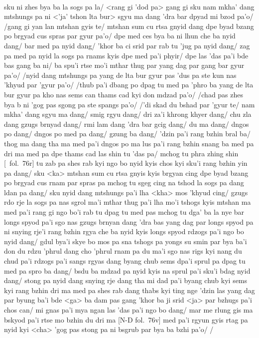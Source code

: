 \documentclass[12pt]{article}
\begin{document}
\textbf{\TVB}\\
sku ni zhes bya ba la sogs pa la/ <rang gi 'dod pa> gang gi sku nam mkha' dang mtshungs pa ni <'ja' tshon lta bur> sgyu ma dang 'dra bar dpyad mi bzod pa'o/ /gang gi yan lan mtshan gyis te/ mtshan sum cu rtsa gnyid dang dpe byad bzang po brgyad cus spras par gyur pa'o/ dpe med ces bya ba ni lhun che ba nyid dang/ bar med pa nyid dang/ 'khor ba ci srid par rab tu 'jug pa nyid dang/ zag pa med pa nyid la sogs pa rnams kyis dpe med pa'i phyir/ dpe las 'das pa'i bde bas gang ba ni/ ba spu'i rtse mo'i mthar thug par yang dag par gang bar gyur pa'o/ /nyid dang mtshungs pa yang de lta bur gyur pas 'dus pa ste kun nas 'khyud par 'gyur pa'o/ /thub pa'i dbang po dpag tu med pa 'phro ba yang de lta bur gyur pa kho nas sems can thams cad kyi don mdzad pa'o/ /chad pas zhes bya b ni 'gog pas sgong pa ste spangs pa'o/ /'di skad du bshad par 'gyur te/ nam mkha' dang sgyu ma dang/ smig rgyu dang/ dri za'i khrong khyer dang/ chu zla dang gzugs brnyad dang/ rmi lam dang 'dra bar gcig dang/ du ma dang/ dngos po dang/ dngos po med pa dang/ gzung ba dang/ 'dzin pa'i rang bzhin bral ba/ thog ma dang tha ma med pa'i dngos po ma lus pa'i rang bzhin snang ba med pa dri ma med pa dpe thams cad las shin tu 'das pa/ mchog tu phra zhing shin [\TVB\ fol.\ 76r] tu zab pa shes rab kyi ngo bo nyid kyis chos kyi sku'i rang bzhin yin pa dang/ sku <ka> mtshan sum cu rtsa gnyis kyis brgyan cing dpe byad bzang po brgyad cus rnam par spras pa mchog tu sgeg cing na tshod la sogs pa dang ldan pa dang/ sku nyid dang mtshungs pa'i lha <kha> mos 'khyud cing/ gzugs rdo rje la sogs pa nas sgrol ma'i mthar thug pa'i lha mo'i tshogs kyis mtshan ma med pa'i rang gi ngo bo'i rab tu dpag tu med pas mchog tu dga' ba la nye bar longs spyod pa'i sgo nas gzugs brnyan dang 'dra bas yang dag par longs spyod pa ni snying rje'i rang bzhin rgya che ba nyid kyis longs spyod rdzogs pa'i ngo bo nyid dang/ gdul bya'i skye bo mos pa sna tshogs pa yongs su smin par bya ba'i don du rdzu 'phrul dang cho 'phrul rnam pa du ma'i sgo nas rigs kyi nang du chud pa'i rdzogs pa'i sangs rgyas dang byang chub sems dpa'i sprul pa dpag tu med pa spro ba dang/ bsdu ba mdzad pa nyid kyis na sprul pa'i sku'i bdag nyid dang/ stong pa nyid dang snying rje dang tha mi dad pa'i byang chub kyi sems kyi rang bzhin dri ma med pa shes rab dang thabs kyi ting nge 'dzin las yang dag par byung ba'i bde <ga> ba dam pas gang 'khor ba ji srid <ja> par bzhugs pa'i chos can/ mi gnas pa'i mya ngan las 'das pa'i ngo bo dang/ mar me rlung gis ma bskyod pa'i rtse mo bzhin du dri ma [N-D fol.\ 76v] med pa'i rgyun gyis rtag pa nyid kyi <cha> 'gog pas stong pa ni bsgrub par bya ba bzhi pa'o/ /
\end{document}
